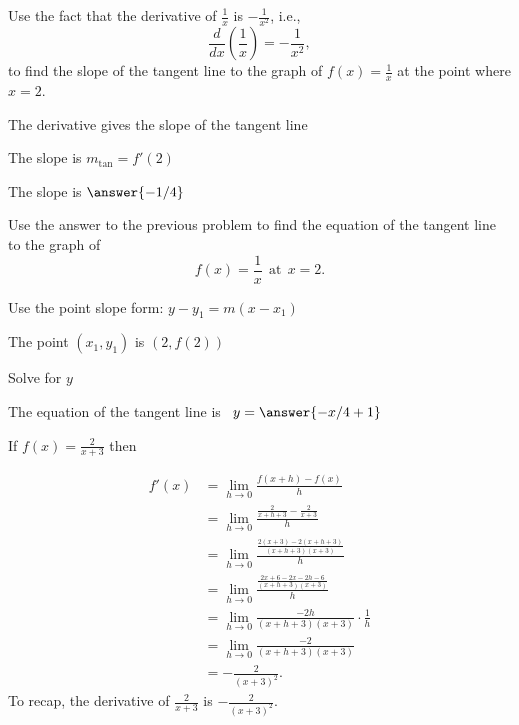 \documentclass{ximera}
\begin{document}
\begin{problem} %
Use the fact that the derivative of $\frac{1}{x}$ is $-\frac{1}{x^2}$,
i.e., 
\[
\frac{d}{dx}\left(\frac{1}{x}\right) = -\frac{1}{x^2},
\]
to find the slope of the tangent line to the graph of 
$f(x) = \frac{1}{x}$ at the point where $x = 2$.\\
\begin{hint}
The derivative gives the slope of the tangent line
\end{hint}
\begin{hint}
The slope is $m_{\text{tan}} = f'(2)$
\end{hint}
The slope is $\answer{-1/4}$
\end{problem}




\begin{problem} %
Use the answer to the previous problem to find the equation of the tangent line to the graph of 
\[
f(x) = \frac{1}{x} \ \ \text{at} \  \ x=2.
\]
\begin{hint}
Use the point slope form: $y-y_1 = m(x-x_1)$
\end{hint}
\begin{hint}
The point $(x_1,y_1)$ is $(2, f(2))$
\end{hint}
\begin{hint}
Solve for $y$
\end{hint}
The equation of the tangent line is \ $y = \answer{-x/4 + 1}$
\end{problem}



\begin{example}[example 7]
If $f(x) = \displaystyle{\frac{2}{x+3}}$ then

\begin{align*}
f'(x) &= \lim_{h \to 0} \frac{f(x+h)-f(x)}{h}\\[5pt]
&= \lim_{h \to 0} \frac{\frac{2}{x+h +3}- \frac{2}{x+3}}{h}\\[5pt]
&= \lim_{h \to 0} \frac{\frac{2(x+3) - 2(x+h+3)}{(x+h+3)(x+3)}}{h} \\[5pt]
&= \lim_{h \to 0} \frac{\frac{2x+6 - 2x-2h-6}{(x+h+3)(x+3)}}{h} \\[5pt]
&=  \lim_{h \to 0} \frac{-2h}{(x+h+3)(x+3)}\cdot \frac{1}{h}\\[5pt]
&= \lim_{h \to 0} \frac{-2}{(x+h+3)(x+3)} \\[5pt]
&= -\frac{2}{(x+3)^2}.
\end{align*}
To recap, the derivative of $\displaystyle{\frac{2}{x+3}}$ is $\displaystyle{-\frac{2}{(x+3)^2}}$.
\end{example}
\end{document}
